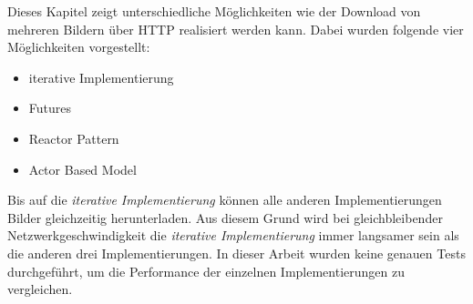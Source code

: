 Dieses Kapitel zeigt unterschiedliche Möglichkeiten wie der Download von mehreren Bildern über HTTP realisiert werden kann. Dabei wurden folgende vier Möglichkeiten vorgestellt: 

\begin{itemize}
  \item iterative Implementierung
  \item Futures
  \item Reactor Pattern
  \item Actor Based Model
\end{itemize}

Bis auf die \emph{iterative Implementierung} können alle anderen Implementierungen Bilder gleichzeitig herunterladen. Aus diesem Grund wird bei gleichbleibender Netzwerkgeschwindigkeit die \emph{iterative Implementierung} immer langsamer sein als die anderen drei Implementierungen. In dieser Arbeit wurden keine genauen Tests durchgeführt, um die Performance der einzelnen Implementierungen zu vergleichen.